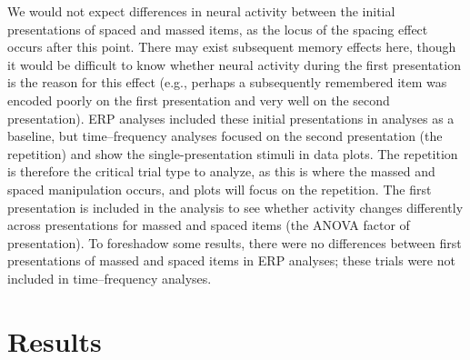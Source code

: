 We would not expect differences in neural activity between the initial presentations of spaced and massed items, as the locus of the spacing effect occurs after this point.
There may exist subsequent memory effects here, though it would be difficult to know whether neural activity during the first presentation is the reason for this effect (e.g., perhaps a subsequently remembered item was encoded poorly on the first presentation and very well on the second presentation).  ERP analyses included these initial presentations in analyses as a baseline, but time--frequency analyses focused on the second presentation (the repetition) and show the single-presentation stimuli in data plots.
\cbstart
The repetition is therefore the critical trial type to analyze, as this is where the massed and spaced manipulation occurs, and plots will focus on the repetition.  The first presentation is included in the analysis to see whether activity changes differently across presentations for massed and spaced items (the ANOVA factor of presentation).  To foreshadow some results, there were no differences between first presentations of massed and spaced items in ERP analyses; these trials were not included in time--frequency analyses.
\cbend






\section{Results}




